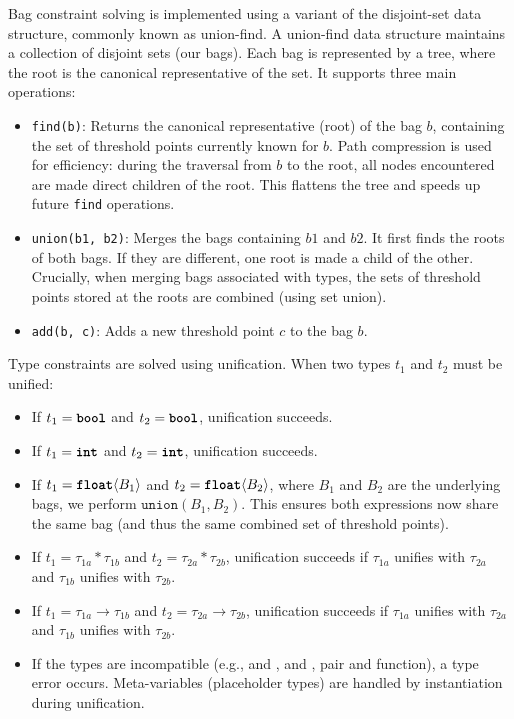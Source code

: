 \documentclass[nonacm,anonymous]{acmart}
\newcommand{\bool}{\text{\ttfamily\bfseries bool}}
\newcommand{\intty}{\text{\ttfamily\bfseries int}}
\newcommand{\float}{\text{\ttfamily\bfseries float}}
\begin{document}
Bag constraint solving is implemented using a variant of the disjoint-set data structure, commonly known as union-find.
A union-find data structure maintains a collection of disjoint sets (our bags). Each bag is represented by a tree, where the root is the canonical representative of the set. It supports three main operations:
\begin{itemize}
    \item \texttt{find(b)}: Returns the canonical representative (root) of the bag $b$, containing the set of threshold points currently known for $b$. Path compression is used for efficiency: during the traversal from $b$ to the root, all nodes encountered are made direct children of the root. This flattens the tree and speeds up future \texttt{find} operations.
    \item \texttt{union(b1, b2)}: Merges the bags containing $b1$ and $b2$. It first finds the roots of both bags. If they are different, one root is made a child of the other. Crucially, when merging bags associated with \float{} types, the sets of threshold points stored at the roots are combined (using set union).
    \item \texttt{add(b, c)}: Adds a new threshold point $c$ to the bag $b$.
\end{itemize}

Type constraints are solved using unification. When two types $t_1$ and $t_2$ must be unified:
\begin{itemize}
    \item If $t_1 = \bool$ and $t_2 = \bool$, unification succeeds.
    \item If $t_1 = \intty$ and $t_2 = \intty$, unification succeeds.
    \item If $t_1 = \float\langle B_1 \rangle$ and $t_2 = \float\langle B_2 \rangle$, where $B_1$ and $B_2$ are the underlying bags, we perform $\texttt{union}(B_1, B_2)$. This ensures both expressions now share the same bag (and thus the same combined set of threshold points).
    \item If $t_1 = \tau_{1a} * \tau_{1b}$ and $t_2 = \tau_{2a} * \tau_{2b}$, unification succeeds if $\tau_{1a}$ unifies with $\tau_{2a}$ and $\tau_{1b}$ unifies with $\tau_{2b}$.
    \item If $t_1 = \tau_{1a} \rightarrow \tau_{1b}$ and $t_2 = \tau_{2a} \rightarrow \tau_{2b}$, unification succeeds if $\tau_{1a}$ unifies with $\tau_{2a}$ and $\tau_{1b}$ unifies with $\tau_{2b}$.
    \item If the types are incompatible (e.g., \bool{} and \float{}, \intty{} and \float{}, pair and function), a type error occurs. Meta-variables (placeholder types) are handled by instantiation during unification.
\end{itemize}
\end{document}
